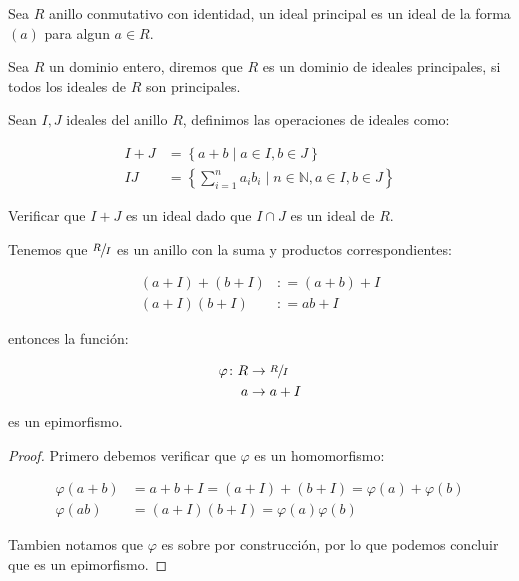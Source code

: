         \begin{definicion}
            Sea $R$ anillo conmutativo con identidad, un ideal principal es un ideal de la forma $(a)$ para algun $a \in R$.
        \end{definicion}

        \begin{definicion}
            Sea $R$ un dominio entero, diremos que $R$ es un dominio de ideales principales, si todos los ideales de $R$ son principales.
        \end{definicion}

        \begin{definicion}
            Sean $I, J$ ideales del anillo $R$, definimos las operaciones de ideales como:

            \begin{align}
                I + J &= \left\{ a + b \mid a \in I, b \in J \right\} \\
                IJ &= \left\{ \sum_{i=1}^n a_i b_i \mid n \in \mathbb{N}, a \in I, b \in J \right\}
            \end{align}
        \end{definicion}

        \begin{ejercicio}
            Verificar que $I + J$ es un ideal dado que $I \cap J$ es un ideal de $R$.
        \end{ejercicio}

        \begin{proposicion}
            Tenemos que $\sfrac{R}{I}$ es un anillo con la suma y productos correspondientes:

            \begin{align*}
                (a + I) + (b + I) &\colon = (a + b) + I \\
                (a + I) (b + I) &\colon = ab + I
            \end{align*}

            entonces la función:

            \begin{align*}
                \varphi \colon R &\to \sfrac{R}{I} \\
                a &\to a + I
            \end{align*}

            es un epimorfismo.
        \end{proposicion}

        \begin{proof}
            Primero debemos verificar que $\varphi$ es un homomorfismo:

            \begin{align*}
                \varphi(a + b) &= a + b + I = (a + I) + (b + I)  = \varphi(a) + \varphi(b) \\
                \varphi(ab) &= (a + I)(b + I) = \varphi(a) \varphi(b)
            \end{align*}

            Tambien notamos que $\varphi$ es sobre por construcción, por lo que podemos concluir que es un epimorfismo.
        \end{proof}

